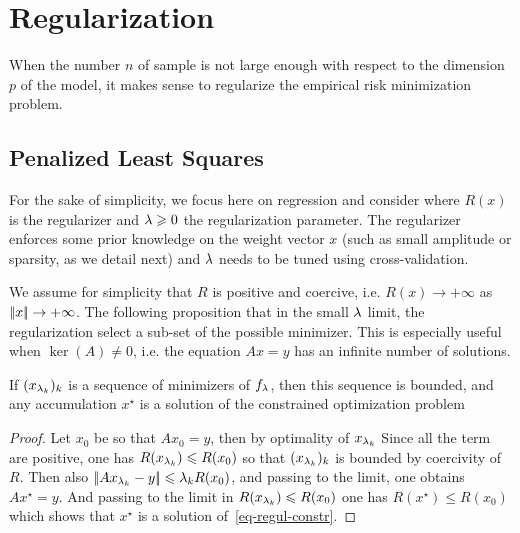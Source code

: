 

\section{Regularization}

When the number $n$ of sample is not large enough with respect to the dimension $p$ of the model, it makes sense to regularize the empirical risk minimization problem. 


\subsection{Penalized Least Squares}

For the sake of simplicity, we focus here on regression and consider
where $R(x)$ is the regularizer and $\lambda\geqslant 0$ the regularization parameter. 
%
The regularizer enforces some prior knowledge on the weight vector $x$ (such as small amplitude or sparsity, as we detail next) and $\lambda$ needs to be tuned using cross-validation.

We assume for simplicity that $R$ is positive and coercive, i.e. $R(x) \rightarrow +\infty$ as $|\!| x |\!| \rightarrow +\infty$. 
%
The following proposition that in the small $\lambda$ limit, the regularization select a sub-set of the possible minimizer. This is especially useful when $\ker(A) \neq 0$, i.e. the equation $Ax=y$ has an infinite number of solutions.

\begin{prop}
	If $(x_{\lambda_k})_k$ is a sequence of minimizers of $f_\lambda$, then this sequence is bounded, and any accumulation $x^\star$ is a solution of the constrained optimization problem
\end{prop}


\begin{proof}
	Let $x_0$ be so that $Ax_0=y$, then by optimality of $x_{\lambda_k}$
	Since all the term are positive, one has $R(x_{\lambda_k}) \leqslant  R(x_0)$ so that $(x_{\lambda_k})_k$ is bounded by coercivity of $R$.
	Then also $|\!| Ax_{\lambda_k}-y |\!| \leqslant \lambda_k R(x_0)$, and passing to the limit, one obtains $Ax^\star = y$.
	And passing to the limit in $R(x_{\lambda_k}) \leqslant R(x_0)$ one has $R(x^\star) \leq R(x_0)$ which shows that $x^\star$ is a solution of~\eqref{eq-regul-constr}. 
\end{proof}

